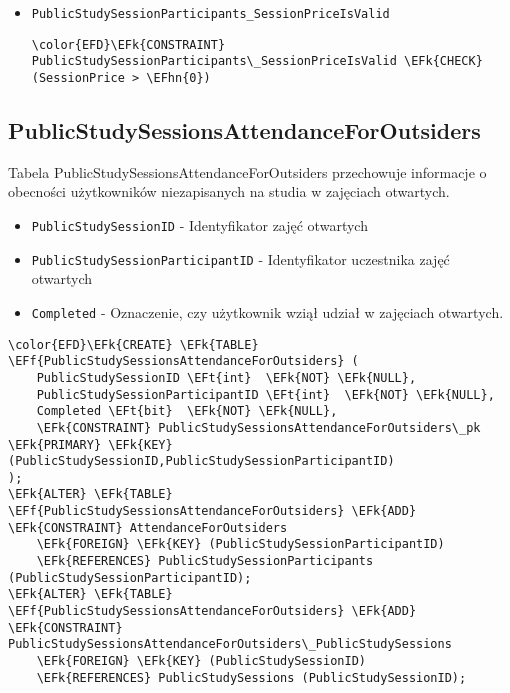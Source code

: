 \documentclass[11pt]{article}
\newcommand{\EFk}[1]{\textcolor{EFk}{\textbf{#1}}} %
\newcommand{\EFf}[1]{\textcolor{EFf}{#1}} %
\newcommand{\EFt}[1]{\textcolor{EFt}{\textbf{#1}}} %
\newcommand{\EFhn}[1]{\textcolor{EFhn}{#1}} %
\begin{document}
\begin{itemize}
\item \texttt{PublicStudySessionParticipants\_SessionPriceIsValid}
\begin{Code}
\begin{Verbatim}
\color{EFD}\EFk{CONSTRAINT} PublicStudySessionParticipants\_SessionPriceIsValid \EFk{CHECK}
(SessionPrice > \EFhn{0})
\end{Verbatim}
\end{Code}
\end{itemize}
\subsection{PublicStudySessionsAttendanceForOutsiders}
\label{sec:org328e03d}
Tabela PublicStudySessionsAttendanceForOutsiders przechowuje informacje o obecności użytkowników niezapisanych na studia w zajęciach otwartych.
\begin{itemize}
\item \texttt{PublicStudySessionID} - Identyfikator zajęć otwartych
\item \texttt{PublicStudySessionParticipantID} - Identyfikator uczestnika zajęć otwartych
\item \texttt{Completed} - Oznaczenie, czy użytkownik wziął udział w zajęciach otwartych.
\end{itemize}
\begin{Code}
\begin{Verbatim}
\color{EFD}\EFk{CREATE} \EFk{TABLE} \EFf{PublicStudySessionsAttendanceForOutsiders} (
    PublicStudySessionID \EFt{int}  \EFk{NOT} \EFk{NULL},
    PublicStudySessionParticipantID \EFt{int}  \EFk{NOT} \EFk{NULL},
    Completed \EFt{bit}  \EFk{NOT} \EFk{NULL},
    \EFk{CONSTRAINT} PublicStudySessionsAttendanceForOutsiders\_pk \EFk{PRIMARY} \EFk{KEY}  (PublicStudySessionID,PublicStudySessionParticipantID)
);
\EFk{ALTER} \EFk{TABLE} \EFf{PublicStudySessionsAttendanceForOutsiders} \EFk{ADD} \EFk{CONSTRAINT} AttendanceForOutsiders
    \EFk{FOREIGN} \EFk{KEY} (PublicStudySessionParticipantID)
    \EFk{REFERENCES} PublicStudySessionParticipants (PublicStudySessionParticipantID);
\EFk{ALTER} \EFk{TABLE} \EFf{PublicStudySessionsAttendanceForOutsiders} \EFk{ADD} \EFk{CONSTRAINT} PublicStudySessionsAttendanceForOutsiders\_PublicStudySessions
    \EFk{FOREIGN} \EFk{KEY} (PublicStudySessionID)
    \EFk{REFERENCES} PublicStudySessions (PublicStudySessionID);
\end{Verbatim}
\end{Code}
\end{document}
